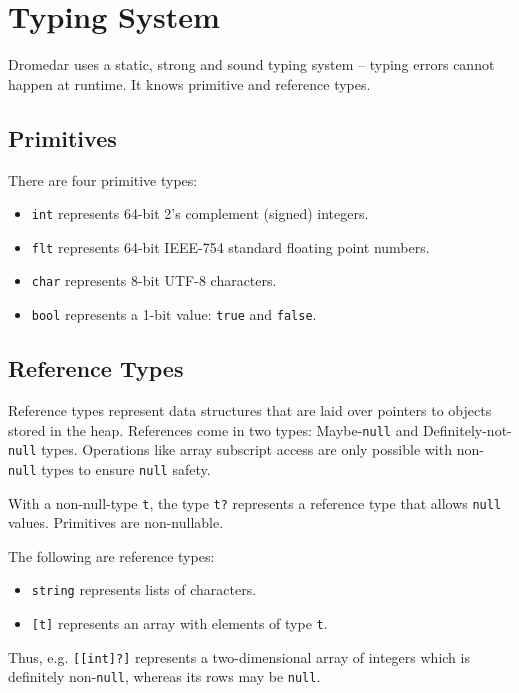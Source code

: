 \documentclass{article}
\newcommand{\code}[1]{\lstinline[columns=fixed]{#1}}
\begin{document}
	\section{Typing System}
	
		Dromedar uses a static, strong and sound typing system -- typing errors cannot happen at runtime. It knows primitive and reference types.
		
		\subsection{Primitives}
		
			There are four primitive types:
			
			\begin{itemize}
				\item \code{int} represents 64-bit 2's complement (signed) integers.
				\item \code{flt} represents 64-bit IEEE-754 standard floating point numbers.
				\item \code{char} represents 8-bit UTF-8 characters.
				\item \code{bool} represents a 1-bit value: \code{true} and \code{false}.
			\end{itemize}
		
		\subsection{Reference Types}
		
			Reference types represent data structures that are laid over pointers to objects stored in the heap. References come in two types: Maybe-\code{null} and Definitely-not-\code{null} types. Operations like array subscript access are only possible with non-\code{null} types to ensure \code{null} safety.
			
			With a non-null-type \code{t}, the type \code{t?} represents a reference type that allows \code{null} values. Primitives are non-nullable.
			
			The following are reference types:
			
			\begin{itemize}
				\item \code{string} represents lists of characters.
				\item \code{[t]} represents an array with elements of type \code{t}.
			\end{itemize}
		
			Thus, e.g. \code{[[int]?]} represents a two-dimensional array of integers which is definitely non-\code{null}, whereas its rows may be \code{null}.
		
\end{document}

